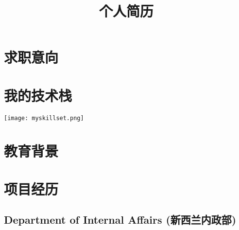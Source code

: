 \documentclass[10pt,a4paper,sans]{moderncv} %
\title{个人简历}
\begin{document}
\makecvtitle %

\section{求职意向}



\section{我的技术栈}

\texttt{[image: myskillset.png]}

\section{教育背景}



\section{项目经历}
\subsection{Department of Internal Affairs (新西兰内政部)}
\end{document}
